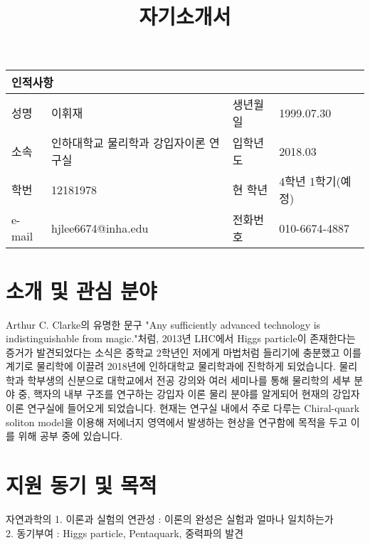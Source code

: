 \documentclass[aps,superscriptaddress,10pt]{revtex4-2}
\begin{document}
\title{자기소개서}
 \maketitle
 \begin{table}[ht]

    \begin{tabular}{|p{1.4cm}|p{5.5cm}|p{1.4cm}|p{5.5cm}|}
    \hline
    \multicolumn{4}{|p{3.5cm}|}{\textbf{\large 인적사항}} \\
    \hline
    \hline
    성명    & 이휘재 & 생년월일     & 1999.07.30 \\
    \hline
    소속    & 인하대학교 물리학과 강입자이론 연구실& 입학년도 & 2018.03 \\
    \hline
    학번    & 12181978 & 현 학년   & 4학년 1학기(예정) \\
    \hline
    e-mail    & hjlee6674@inha.edu & 전화번호 & 010-6674-4887 \\
    \hline
    \end{tabular}
    
    \end{table}


    
\section{소개 및 관심 분야}\small\noindent
Arthur C. Clarke의 유명한 문구
"Any sufficiently advanced technology is indistinguishable from magic."처럼,
2013년 LHC에서 Higgs particle이 존재한다는 증거가 발견되었다는 소식은 중학교 2학년인
저에게 마법처럼 들리기에 충분했고 이를 계기로 물리학에 이끌려 2018년에 인하대학교 물리학과에 
진학하게 되었습니다. 물리학과 학부생의 신분으로 대학교에서 전공 강의와 여러 세미나를 통해
물리학의 세부 분야 중, 핵자의 내부 구조를 연구하는 강입자 이론 물리 분야를 알게되어
현재의 강입자이론 연구실에 들어오게 되었습니다. 현재는 연구실 내에서 주로 다루는
Chiral-quark soliton model을 이용해 저에너지 영역에서 발생하는 현상을 연구함에 목적을
두고 이를 위해 공부 중에 있습니다.

\section{지원 동기 및 목적}\noindent
자연과학의 
1. 이론과 실험의 연관성 : 이론의 완성은 실험과 얼마나 일치하는가
\\
2. 동기부여 : Higgs particle, Pentaquark, 중력파의 발견
\vfill
\end{document}
